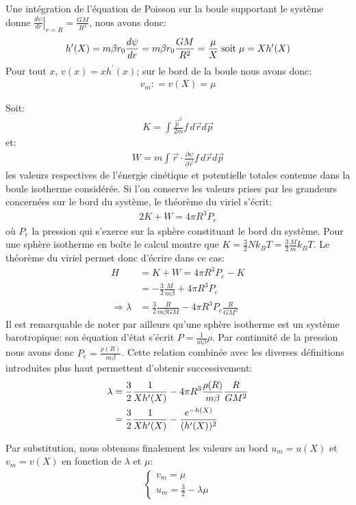 	Une intégration de l'équation de Poisson sur la boule supportant le système donne $\left.\frac{d \psi}{dr}
	\right|_{r=R}= \frac{GM}{R^2}$, nous avons donc:
	\begin{align*}
		h'(X) = m\beta r_0 \frac{d \psi}{dr} = m\beta r_0 \frac{GM}{R^2} = \frac{\mu}{X} \;\textrm{soit}\; \mu = Xh'(X)
	\end{align*}
	Pour tout $x$, $v(x)=xh^{\prime}(x)$; sur le bord de la boule nous avons donc:
	\begin{align}
		 v_m: = v\left(X\right) = \mu\label{vmmu}
	\end{align}

	Soit:
	\begin{align*}K=\int \frac{\vec{p}^2}{2m}f\, d\vec{r}d\vec{p}\end{align*}
		et:
	\begin{align*}W=m\int \vec{r}\cdot \frac{\partial \psi}{\partial \vec{r}}f\, d\vec{r}d\vec{p}\end{align*}
	les valeurs respectives de l'énergie cinétique et potentielle totales contenue dans la boule isotherme considérée. Si l'on conserve les valeurs prises par les grandeurs concernées sur le bord du système, le théorème du viriel  s'écrit:
	\begin{align}
		2K + W = 4\pi R^3 P_e \label{virielinabox}
	\end{align}
	 où $P_e$ la pression qui s'exerce sur la sphère constituant le bord du système.
	Pour une sphère isotherme en boîte  le calcul montre que \mbox{$K = \frac{3}{2} N k_B T = \frac{3}{2} \frac{M}{m} k_B T$}. Le théorème du
	viriel permet donc d'écrire dans ce cas:
	\begin{align*}
		H &= K + W =  4\pi R^3 P_e - K \\
		  &= -\frac{3}{2} \frac{M}{m\beta} + 4\pi R^3 P_e \\
		\Rightarrow \lambda &= \frac{3}{2}\frac{R}{m\beta GM} - 4\pi R^3 P_e \frac{R}{GM^2}
	\end{align*}
	Il est remarquable de noter par ailleurs qu'une sphère isotherme est un système barotropique: son équation d'état s'écrit
	$P=\frac{1}{m\beta}\rho$. Par continuité de la pression nous avons donc $P_e = \frac{\rho(R)}{m\beta}$. Cette relation combinée avec les
	diverses définitions introduites plus haut permettent d'obtenir successivement:
	\begin{align}
		\lambda &= \frac{3}{2}\frac{1}{Xh'(X)} - 4\pi R^3 \frac{\rho(R)}{m\beta} \frac{R}{GM^2} \notag \\
			&= \frac{3}{2}\frac{1}{Xh'(X)} - \frac{e^{-h(X)}}{(h'(X))^2}\label{lamum}
	\end{align}

	Par substitution, nous obtenons finalement les valeurs au bord $u_m=u(X)$ et $v_m=v(X)$ en fonction de $\lambda$ et $\mu$:
	\begin{align}
		\label{uv_max}
		\left\{\begin{array}{l}
			v_m = \mu \\
			u_m = \frac{3}{2} - \lambda \mu
		\end{array}\right.
	\end{align}

